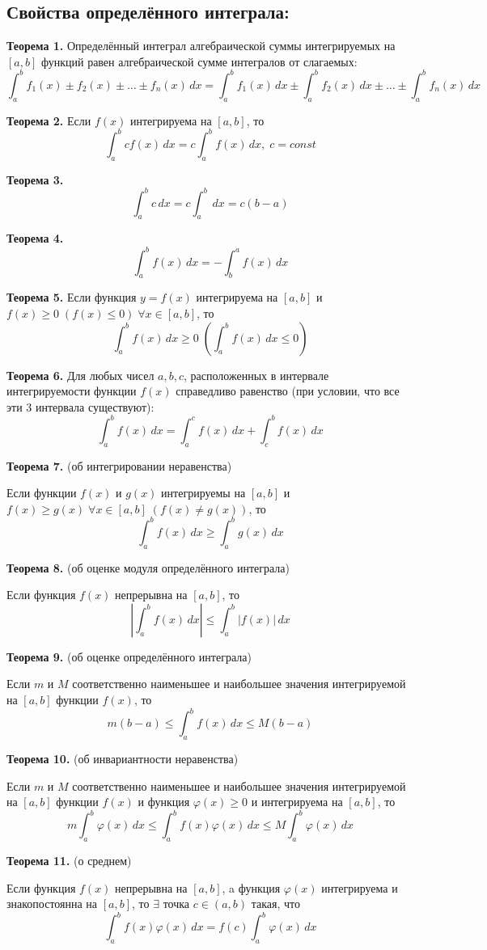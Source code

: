 \documentclass[11pt]{article}
\begin{document}
\subsection*{Свойства определённого интеграла:}
\par\textbf{Теорема 1.} Определённый интеграл алгебраической суммы интегрируемых на $[a, b]$ функций равен алгебраической сумме интегралов от слагаемых: $$\int_{a}^b f_{1}(x) \pm f_{2}(x) \pm \dots \pm f_{n}(x)\, dx = \int_{a}^b f_{1}(x) \, dx \pm \int_{a}^b f_{2}(x) \, dx  \pm \dots \pm \int_{a}^b f_{n}(x) \, dx$$
\par\textbf{Теорема 2.} Если $f(x)$ интегрируема на $[a, b]$, то $$\int_{a}^b c f(x) \, dx = c \int_{a}^b f(x) \, dx, \; c = const$$
\par\textbf{Теорема 3.} $$\int_{a}^b c \, dx = c \int_{a}^b \, dx = c(b - a)$$
\par\textbf{Теорема 4.} $$\int_{a}^b f(x) \, dx = - \int_{b}^a f(x) \, dx$$
\par\textbf{Теорема 5.} Если функция $y = f(x)$ интегрируема на $[a, b]$ и $f(x) \geq 0 \; (f(x) \leq 0) \; \forall x \in [a, b]$, то $$\int_{a}^b f(x) \, dx \geq 0 \; \left( \int_{a}^b f(x) \, dx \leq 0 \right)$$
\par\textbf{Теорема 6.} Для любых чисел $a, b, c$, расположенных в интервале интегрируемости функции $f(x)$ справедливо равенство (при условии, что все эти 3 интервала существуют): $$\int_{a}^b f(x) \, dx = \int_{a}^c f(x) \, dx + \int_{c}^b f(x) \, dx$$
\par\textbf{Теорема 7.} (об интегрировании неравенства)
\par Если функции $f(x)$ и $g(x)$ интегрируемы на $[a, b]$ и $f(x) \geq g(x) \; \forall x \in [a, b] \; (f(x) \neq g(x))$, то $$\int_{a}^b f(x) \, dx \geq \int_{a}^b g(x) \, dx$$
\par\textbf{Теорема 8.} (об оценке модуля определённого интеграла)
\par Если функция $f(x)$ непрерывна на $[a, b]$, то $$\left| \int_{a}^b f(x) \, dx \right| \leq \int_{a}^b |f(x)| \, dx$$
\par\textbf{Теорема 9.} (об оценке определённого интеграла)
\par Если $m$ и $M$ соответственно наименьшее и наибольшее значения интегрируемой на $[a, b]$ функции $f(x)$, то $$m(b - a) \leq \int_{a}^b f(x) \, dx \leq M(b - a)$$
\par\textbf{Теорема 10.} (об инвариантности неравенства)
\par Если $m$ и $M$ соответственно наименьшее и наибольшее значения интегрируемой на $[a, b]$ функции $f(x)$ и функция $\varphi(x) \geq 0$ и интегрируема на $[a, b]$, то $$m \int_{a}^b \varphi(x) \, dx \leq \int_{a}^b f(x) \varphi(x) \, dx \leq M \int_{a}^b \varphi(x) \, dx$$
\par\textbf{Теорема 11.} (о среднем)
\par Если функция $f(x)$ непрерывна на $[a, b]$, a функция $\varphi(x)$ интегрируема и знакопостоянна на $[a, b]$, то $\exists$ точка $c \in (a, b)$ такая, что $$\int_{a}^b f(x)\varphi(x) \, dx = f(c) \int_{a}^b \varphi(x) \, dx$$
\end{document}
